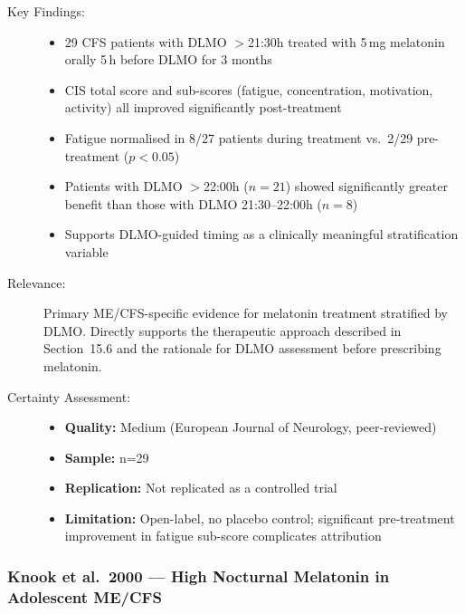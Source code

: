 
\begin{description}
    \item[Key Findings:]
    \begin{itemize}
        \item 29 CFS patients with DLMO $>$21:30h treated with 5\,mg melatonin orally 5\,h before DLMO for 3 months
        \item CIS total score and sub-scores (fatigue, concentration, motivation, activity) all improved significantly post-treatment
        \item Fatigue normalised in 8/27 patients during treatment vs.\ 2/29 pre-treatment ($p < 0.05$)
        \item Patients with DLMO $>$22:00h ($n=21$) showed significantly greater benefit than those with DLMO 21:30--22:00h ($n=8$)
        \item Supports DLMO-guided timing as a clinically meaningful stratification variable
    \end{itemize}
    \item[Relevance:] Primary ME/CFS-specific evidence for melatonin treatment stratified by DLMO. Directly supports the therapeutic approach described in Section~15.6 and the rationale for DLMO assessment before prescribing melatonin.
    \item[Certainty Assessment:]
    \begin{itemize}
        \item \textbf{Quality:} Medium (European Journal of Neurology, peer-reviewed)
        \item \textbf{Sample:} n=29
        \item \textbf{Replication:} Not replicated as a controlled trial
        \item \textbf{Limitation:} Open-label, no placebo control; significant pre-treatment improvement in fatigue sub-score complicates attribution
    \end{itemize}
\end{description}

\subsubsection*{Knook et al.\ 2000 --- High Nocturnal Melatonin in Adolescent ME/CFS}


